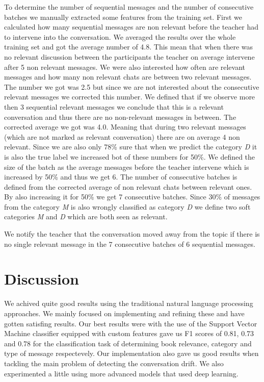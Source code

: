 \documentclass[11pt,a4paper]{article}
\begin{document}
To determine the number of sequential messages and the number of consecutive batches we manually extracted some features from the training set.
First we calculated how many sequential messages are non relevant before the teacher had to intervene into the conversation.
We averaged the results over the whole training set and got the average number of 4.8.
This mean that when there was no relevant discussion between the participants the teacher on average intervene after 5 non relevant messages.
We were also interested how often are relevant messages and how many non relevant chats are between two relevant messages.
The number we got was 2.5 but since we are not interested about the consecutive relevant messages we corrected this number.
We defined that if we observe more then 3 sequential relevant messages we conclude that this is a relevant conversation and thus there are no non-relevant messages in between.
The corrected average we got was 4.0.
Meaning that during two relevant messages (which are not marked as relevant conversation) there are on average 4 non relevant.
Since we are also only 78\% sure that when we predict the category \textit{D} it is also the true label we increased bot of these numbers for 50\%.
We defined the size of the batch as the average messages before the teacher intervene which is increased by 50\% and thus we get 6.
The number of consecutive batches is defined from the corrected average of non relevant chats between relevant ones.
By also increasing it for 50\% we get 7 consecutive batches.
Since 30\% of messages from the category \textit{M} is also wrongly classified as category \textit{D} we define two soft categories \textit{M} and \textit{D} which are both seen as relevant.

We notify the teacher that the conversation moved away from the topic if there is no single relevant message in the 7 consecutive batches of 6 sequential messages.

\section{Discussion} 

We achived quite good results using the traditional natural language processing approaches.
We mainly focused on implementing and refining these and have gotten satisfing results.
Our best results were with the use of the Support Vector Machine classifier equipped with custom features gave us F1 scores of 0.81, 0.73 and 0.78 for the classification task of determining book relevance, category and type of message respectevely.
Our implementation also gave us good results when tackling the main problem of detecting the conversation drift.
We also experimented a little using more advanced models that used deep learning.
\end{document}
